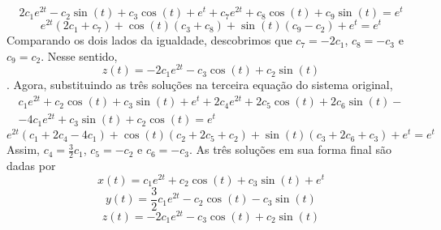 \documentclass[oneside,12pt,a4paper]{report}
\begin{document}
\begin{resolucao}
        \[2c_1e^{2t}-c_2\sin(t)+c_3\cos(t)+e^t+c_7e^{2t}+c_8\cos(t)+c_9\sin(t)=e^t\]
        \[e^{2t}(2c_1+c_7)+\cos(t)(c_3+c_8)+\sin(t)(c_9-c_2)+e^t=e^t\]
        Comparando os dois lados da igualdade, descobrimos que $c_7=-2c_1$, $c_8=-c_3$ e $c_9=c_2$. Nesse sentido, \[z(t)=-2c_1e^{2t}-c_3\cos(t)+c_2\sin(t)\]. Agora, substituindo as três soluções na terceira equação do sistema original,
        \begin{align*}
            c_1e^{2t}+c_2\cos(t)+c_3\sin(t)+e^t+2c_4e^{2t}+2c_5\cos(t)+2c_6\sin(t)-\\
            -4c_1e^{2t}+c_3\sin(t)+c_2\cos(t)=e^t
        \end{align*}
        \[e^{2t}(c_1+2c_4-4c_1)+\cos(t)(c_2+2c_5+c_2)+\sin(t)(c_3+2c_6+c_3)+e^t=e^t\]
        Assim, $c_4=\frac{3}{2}c_1$, $c_5=-c_2$ e $c_6=-c_3$. As três soluções em sua forma final são dadas por
        \[\boxed{x(t)=c_1e^{2t}+c_2\cos(t)+c_3\sin(t)+e^t}\]
        \[\boxed{y(t)=\frac{3}{2}c_1e^{2t}-c_2\cos(t)-c_3\sin(t)}\]
        \[\boxed{z(t)=-2c_1e^{2t}-c_3\cos(t)+c_2\sin(t)}\]

    \end{resolucao}
\end{document}
